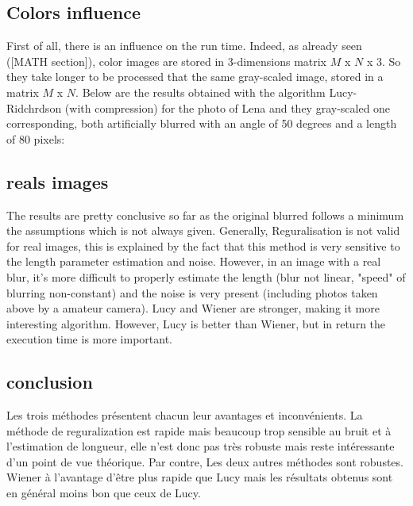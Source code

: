 \subsection{Colors influence}

First of all, there is an influence on the run time. Indeed, as already seen ([MATH section]), color images are stored in 3-dimensions matrix $M$ x $N$ x $3$. So they take longer to be processed that the same gray-scaled image, stored in a matrix $M$ x $N$.
Below are the results obtained with the algorithm Lucy-Ridchrdson (with compression) for the photo of Lena and they gray-scaled one corresponding, both artificially blurred with an angle of 50 degrees and a length of 80 pixels:


 

\subsection{reals images}

 
The results are pretty conclusive so far as the original blurred follows a minimum the assumptions which is not always given. Generally, Reguralisation is not valid for real images, this is explained by the fact that this method is very sensitive to the length parameter estimation and noise. However, in an image with a real blur, it's more difficult to properly estimate the length (blur not linear, "speed" of blurring non-constant) and the noise is very present (including photos taken above by a amateur camera). Lucy and Wiener are stronger, making it more interesting algorithm. However, Lucy is better than Wiener, but in return the execution time is more important.

\subsection{conclusion}

Les trois méthodes présentent chacun leur avantages et inconvénients. La méthode de reguralization est rapide mais beaucoup trop sensible au bruit et à l'estimation de longueur, elle n'est donc pas très robuste mais reste intéressante d'un point de vue théorique. Par contre, Les deux autres méthodes sont robustes. Wiener à l'avantage d'être plus rapide que Lucy mais les résultats obtenus sont en général moins bon que ceux de Lucy. 


